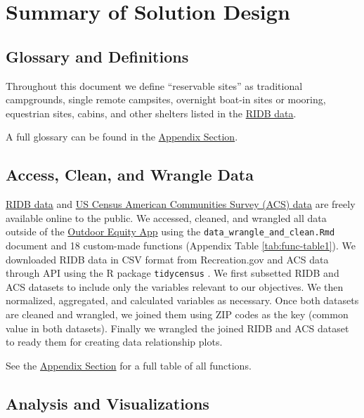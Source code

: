 \documentclass[
  11 pt,
  openany]{book}
\begin{document}
\hypertarget{summary-of-solution-design}{%
\chapter{Summary of Solution Design}\label{summary-of-solution-design}}

\hypertarget{glossary-and-definitions}{%
\section{Glossary and Definitions}\label{glossary-and-definitions}}

Throughout this document we define ``reservable sites'' as traditional campgrounds, single remote campsites, overnight boat-in sites or mooring, equestrian sites, cabins, and other shelters listed in the \href{https://ridb.recreation.gov/}{RIDB data}.

A full glossary can be found in the \protect\hyperlink{glossary-table}{Appendix Section}.

\hypertarget{access-clean-and-wrangle-data}{%
\section{Access, Clean, and Wrangle Data}\label{access-clean-and-wrangle-data}}

\href{https://ridb.recreation.gov/}{RIDB data} and \href{https://www.census.gov/programs-surveys/acs/data.html}{US Census American Communities Survey (ACS) data} are freely available online to the public. We accessed, cleaned, and wrangled all data outside of the \href{https://shinyapps.bren.ucsb.edu/oe_app/}{Outdoor Equity App} using the \texttt{data\_wrangle\_and\_clean.Rmd} document and 18 custom-made functions (Appendix Table \ref{tab:func-table1}). We downloaded RIDB data in CSV format from Recreation.gov and ACS data through API using the R package \texttt{tidycensus} \citep{R-tidycensus}. We first subsetted RIDB and ACS datasets to include only the variables relevant to our objectives. We then normalized, aggregated, and calculated variables as necessary. Once both datasets are cleaned and wrangled, we joined them using ZIP codes as the key (common value in both datasets). Finally we wrangled the joined RIDB and ACS dataset to ready them for creating data relationship plots.

See the \protect\hyperlink{functions-table}{Appendix Section} for a full table of all functions.

\hypertarget{analysis-and-visualizations}{%
\section{Analysis and Visualizations}\label{analysis-and-visualizations}}
\end{document}
